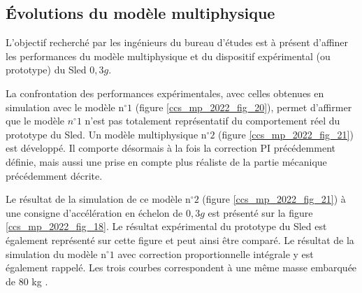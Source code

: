 

\subsection{Évolutions du modèle multiphysique \label{ccs_mp_2022_sec_4C}}
\begin{obj}
L'objectif recherché par les ingénieurs du bureau d'études est à présent d'affiner les performances du modèle multiphysique et du dispositif expérimental (ou prototype) du Sled $0,3 g$.
\end{obj}

La confrontation des performances expérimentales, avec celles obtenues en simulation avec le modèle $\mathrm{n}^{\circ} 1$ (figure \ref{ccs_mp_2022_fig_20}), permet d'affirmer que le modèle $n^{\circ} 1$ n'est pas totalement représentatif du comportement réel du prototype du Sled. Un modèle multiphysique $\mathrm{n}^{\circ} 2$ (figure \ref{ccs_mp_2022_fig_21}) est développé. Il comporte désormais à la fois
la correction PI précédemment définie, mais aussi une prise en compte plus réaliste de la partie mécanique précédemment décrite.

Le résultat de la simulation de ce modèle $\mathrm{n}^{\circ} 2$ (figure \ref{ccs_mp_2022_fig_21}) à une consigne d'accélération en échelon de $0,3 g$ est présenté sur la figure \ref{ccs_mp_2022_fig_18}. Le résultat expérimental du prototype du Sled est également représenté sur cette figure et peut ainsi être comparé. Le résultat de la simulation du modèle $\mathrm{n}^{\circ} 1$ avec correction proportionnelle intégrale y est également rappelé. Les trois courbes correspondent à une même masse embarquée de 80 kg .

